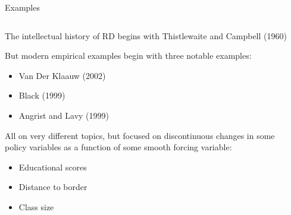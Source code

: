 \documentclass[notes,11pt, aspectratio=169]{beamer}
\newenvironment{wideitemize}{\itemize\addtolength{\itemsep}{10pt}}{\enditemize}
\begin{document}
\begin{frame}{Examples}
    \begin{columns}[onlytextwidth, T] %
      \begin{column}{.6\textwidth}
        \begin{wideitemize}
        \item The intellectual history of RD
          begins with Thistlewaite and Campbell (1960)
        \item But modern empirical examples begin with three notable examples:
          \begin{itemize}
          \item Van Der Klaauw (2002)
          \item Black (1999)            
          \item Angrist and Lavy (1999)
          \end{itemize}
        \item All on very different topics, but focused on discontinuous changes in some policy variables as a function of some smooth forcing variable:
          \begin{itemize}
          \item Educational scores
          \item Distance to border
          \item Class size
          \end{itemize}
        \end{wideitemize}
      \end{column}%
      \hfill%
      \begin{column}{.4\textwidth}

\end{column}
\end{columns}
\end{frame}
\end{document}

